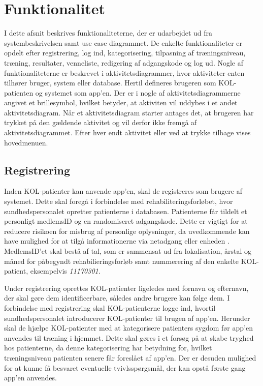 \section{Funktionalitet}
I dette afsnit beskrives funktionaliteterne, der er udarbejdet ud fra systembeskrivelsen samt use case diagrammet. De enkelte funktionaliteter er opdelt efter registrering, log ind, kategorisering, tilpasning af træningsniveau, træning, resultater, venneliste, redigering af adgangskode og log ud. Nogle af funktionaliteterne er beskrevet i aktivitetsdiagrammer, hvor aktiviteter enten tilhører bruger, system eller database. Hertil defineres brugeren som KOL-patienten og systemet som app'en. Der er i nogle af aktivitetsdiagrammerne angivet et brillesymbol, hvilket betyder, at aktiviten vil uddybes i et andet aktivitetsdiagram. Når et aktivitetsdiagram starter antages det, at brugeren har trykket på den gældende aktivitet og vil derfor ikke fremgå af aktivitetsdiagrammet. Efter hver endt aktivitet eller ved at trykke tilbage vises hovedmenuen. 

\subsection*{Registrering} \label{sec:registrering}
Inden KOL-patienter kan anvende app'en, skal de registreres som brugere af systemet. Dette skal foregå i forbindelse med rehabiliteringsforløbet, hvor sundhedspersonalet opretter patienterne i databasen. Patienterne får tildelt et personligt medlemsID og en randomiseret adgangskode. Dette er vigtigt for at reducere risikoen for misbrug af personlige oplysninger, da uvedkommende kan have mulighed for at tilgå informationerne via netadgang eller enheden \cite{Sundhedsdatastyrelsen2016}. MedlemsID'et skal bestå af tal, som er sammensat ud fra lokalisation, årstal og måned for påbegyndt rehabilieringsforløb samt nummerering af den enkelte KOL-patient, eksempelvis \textit{11170301}.

Under registrering oprettes KOL-patienter ligeledes med fornavn og efternavn, der skal gøre dem identificerbare, således andre brugere kan følge dem. I forbindelse med registrering skal KOL-patienterne logge ind, hvortil sundhedspersonalet introducerer KOL-patienter til brugen af app'en. Herunder skal de hjælpe KOL-patienter med at kategorisere patienters sygdom før app'en anvendes til træning i hjemmet. Dette skal gøres i et forsøg på at skabe tryghed hos patienterne, da denne kategorisering har betydning for, hvilket træningsniveau patienten senere får foreslået af app'en. Der er desuden mulighed for at kunne få besvaret eventuelle tvivlsspørgsmål, der kan opstå første gang app'en anvendes. 


